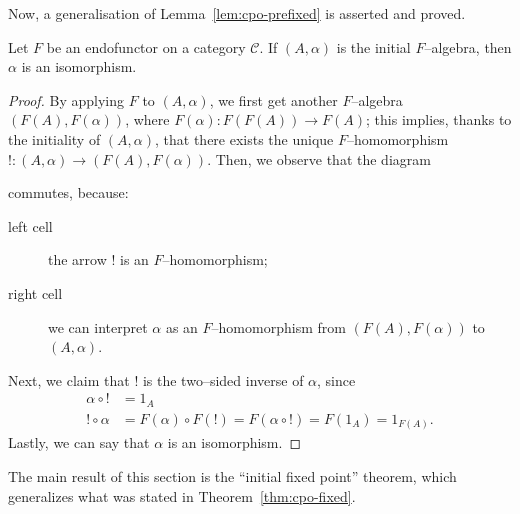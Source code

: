 Now, a generalisation of Lemma~\ref{lem:cpo-prefixed} is asserted and proved.
\begin{lem}
  Let \(F\) be an endofunctor on a category \(\mathcal{C}\).
  If \((A,\alpha)\) is the initial \(F\)--algebra, then \(\alpha{}\) is an isomorphism.
\end{lem}
\begin{proof}
  By applying \(F\) to \((A,\alpha)\), we first get another \(F\)--algebra \((F(A),F(\alpha))\), where \(F(\alpha) \colon F(F(A)) \to F(A)\); this implies, thanks to the initiality of \((A,\alpha)\), that there exists the unique \(F\)--homomorphism \(! \colon (A,\alpha) \to (F(A),F(\alpha))\).
  Then, we observe that the diagram
    \begin{center}
    \end{center}
 commutes, because:
  \begin{description}
    \item[left cell] the arrow \(!{}\) is an \(F\)--homomorphism;
    \item[right cell] we can interpret \(\alpha{}\) as an \(F\)--homomorphism from \((F(A),F(\alpha))\) to \((A,\alpha)\).
  \end{description}
  Next, we claim that \(!{}\) is the two--sided inverse of \(\alpha{}\), since
  \begin{align*}
    \alpha \circ ! &= 1_A \\
    ! \circ \alpha &= F(\alpha) \circ F(!) = F (\alpha \circ !) = F(1_A) = 1_{F(A)}.
  \end{align*}
  Lastly, we can say that \(\alpha{}\) is an isomorphism.
\end{proof}

The main result of this section is the ``initial fixed point'' theorem, which generalizes what was stated in Theorem~\ref{thm:cpo-fixed}.

